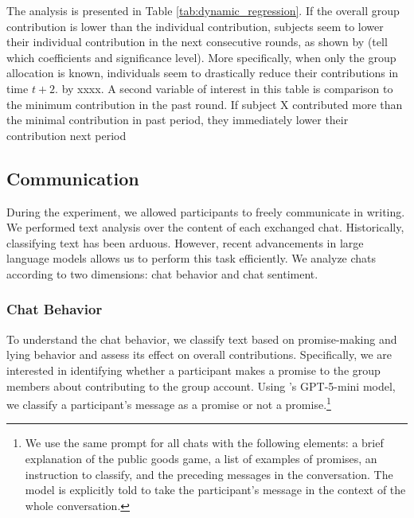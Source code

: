 \documentclass[12pt,letterpaper,english]{article}
\begin{document}
 The analysis is presented in Table \ref{tab:dynamic_regression}. If the overall group contribution is lower than the individual contribution, subjects seem to lower their individual contribution in the next consecutive rounds, as shown by (tell which coefficients and significance level). More specifically, when only the group allocation is known, individuals seem to drastically reduce their contributions in time $t+2$. by xxxx. A second variable of interest in this table is comparison to the minimum contribution in the past round. If subject X contributed more than the minimal contribution in past period, they immediately lower their contribution next period %

\begin{table}[htbp]
    \centering \footnotesize
    
    \caption{Dynamic Panel Regression Analysis. Columns report the IF and AF treatments using the group-mean deviation regressors. Arellano-Bond two-step GMM with Windmeijer-corrected robust standard errors in parentheses. Instruments: lags 2--5 of contribution.}
    \label{tab:dynamic_regression}
\end{table}

\newpage
\subsection{Communication}
During the experiment, we allowed participants to freely communicate in writing. We performed  text analysis over the content of each exchanged chat. Historically, classifying text has been arduous. However, recent advancements in large language models allows us to perform this task efficiently.
We analyze chats according to two dimensions: chat behavior and chat sentiment. 
\subsubsection{Chat Behavior}
To understand the chat behavior, we classify text based on promise-making and lying behavior and assess its effect on overall contributions. Specifically, we are interested in identifying whether a participant makes a promise to the  group members about contributing to the group account. Using \cite{openai_gpt5mini_2025}'s GPT-5-mini model, we classify a participant's message as a promise or not a promise.\footnote{ We use the same prompt for all chats with the following elements: a brief explanation of the public goods game, a list of examples of promises, an instruction to classify, and the 
preceding messages in the conversation. The model is explicitly told to take the participant's message in the context of the whole conversation.}
\end{document}
